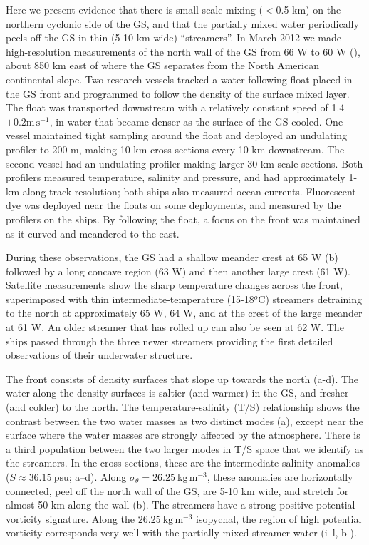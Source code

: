 \documentclass{natureJMK}
\begin{document}
Here we present evidence that there is small-scale mixing ($<$0.5 km)  on the northern cyclonic side of the GS, and that the partially mixed water periodically peels off the GS in thin (5-10 km wide) ``streamers''.  In March 2012 we made high-resolution measurements of the north wall of the GS from 66 W to 60 W (), about 850 km east of where the GS separates from the North American continental slope.  Two research vessels tracked a water-following float placed in the GS front and programmed to follow the density of the surface mixed layer. The float was transported downstream with a relatively constant speed of 1.4 $\pm 0.2 \mathrm{m\,s^{-1}}$, in water that became denser  as the surface of the GS cooled.  One vessel maintained tight sampling around the float and deployed an undulating profiler to 200 m, making 10-km cross sections every 10 km downstream.  The second vessel  had an undulating profiler making larger 30-km  scale sections.  Both profilers measured temperature, salinity and pressure, and had approximately 1-km along-track resolution; both ships also measured ocean currents.  Fluorescent dye was deployed near the floats on some deployments, and measured by the profilers on the ships. By following the float, a focus on the front was maintained as it curved and meandered to the east.  

During these observations, the GS had a shallow meander crest at 65 W (b)  followed by a long concave region (63 W) and then another large  crest (61 W).  Satellite measurements show the sharp temperature changes across the front, superimposed with thin intermediate-temperature (15-18$^o$C) streamers detraining to the north at approximately 65 W, 64 W, and at the crest of the large meander at 61 W.  An older streamer that has rolled up can also be seen at 62 W.  The ships passed through the three newer streamers providing the first detailed observations of their underwater structure.  

The front consists of density surfaces that slope up towards the north (a-d).  The water along the density surfaces is saltier (and warmer) in the GS, and fresher (and colder) to the north.  The temperature-salinity (T/S) relationship shows the contrast between the two water masses as two distinct modes (a), except near the surface where the water masses are strongly affected by the atmosphere.  There is a third population between the two larger modes in T/S space that we identify as the streamers.  In the cross-sections, these are the intermediate salinity anomalies ($S \approx 36.15\ \mathrm{psu}$; a--d).  Along $\sigma_{\theta}=26.25\ \mathrm{kg\,m^{-3}}$, these anomalies are horizontally connected, peel off the north wall of the GS, are 5-10 km wide, and  stretch for almost 50 km along the wall (b). The streamers have a strong positive potential vorticity signature.  Along the $26.25 \ \mathrm{kg\,m^{-3}}$ isopycnal, the region of high potential vorticity corresponds very well with the partially mixed streamer water (i--l, b ).   
\end{document}
